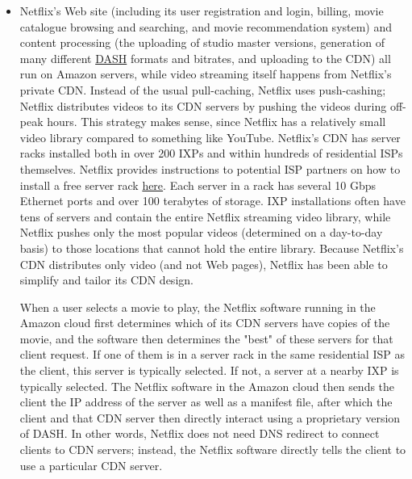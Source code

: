 \documentclass[table, xcdraw]{article}%
\begin{document}
\begin{itemize}
    \item Netflix's Web site (including its user registration and login, billing, movie catalogue browsing and searching, and movie recommendation system) and content processing (the uploading of studio master versions, generation of many different \hyperref[DASH]{DASH} formats and bitrates, and uploading to the CDN) all run on Amazon servers, while video streaming itself happens from Netflix's private CDN. Instead of the usual pull-caching, Netflix uses push-cashing; Netflix distributes videos to its CDN servers by pushing the videos during off-peak hours. This strategy makes sense, since Netflix has a relatively small video library compared to something like YouTube. Netflix's CDN has server racks installed both in over 200 IXPs and within hundreds of residential ISPs themselves. Netflix provides instructions to potential ISP partners on how to install a free server rack \href{https://openconnect.netflix.com/en/}{here}. Each server in a rack has several 10 Gbps Ethernet ports and over 100 terabytes of storage. IXP installations often have tens of servers and contain the entire Netflix streaming video library, while Netflix pushes only the most popular videos (determined on a day-to-day basis) to those locations that cannot hold the entire library. Because Netflix's CDN distributes only video (and not Web pages), Netflix has been able to simplify and tailor its CDN design.
    
    When a user selects a movie to play, the Netflix software running in the Amazon cloud first determines which of its CDN servers have copies of the movie, and the software then determines the "best" of these servers for that client request. If one of them is in a server rack in the same residential ISP as the client, this server is typically selected. If not, a server at a nearby IXP is typically selected. The Netflix software in the Amazon cloud then sends the client the IP address of the server as well as a manifest file, after which the client and that CDN server then directly interact using a proprietary version of DASH. In other words, Netflix does not need DNS redirect to connect clients to CDN servers; instead, the Netflix software directly tells the client to use a particular CDN server.
\end{itemize}
\end{document}
